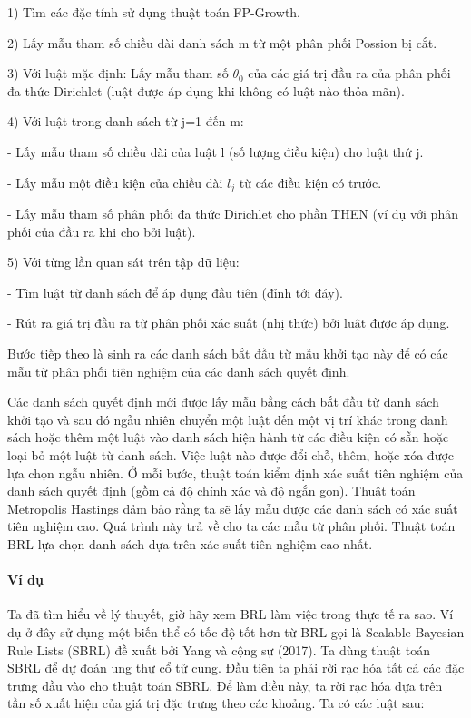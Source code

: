 1) Tìm các đặc tính sử dụng thuật toán FP-Growth.

2) Lấy mẫu tham số chiều dài danh sách m từ một phân phối Possion bị cắt.

3) Với luật mặc định: Lấy mẫu tham số $\theta_0$ của các giá trị đầu ra của phân phối đa thức Dirichlet (luật được áp dụng khi không có luật nào thỏa mãn).

4) Với luật trong danh sách từ j=1 đến m:

- Lấy mẫu tham số chiều dài của luật l (số lượng điều kiện) cho luật thứ j.

- Lấy mẫu một điều kiện của chiều dài $l_j$ từ các điều kiện có trước.

- Lấy mẫu tham số phân phối đa thức Dirichlet cho phần THEN (ví dụ với phân phối của đầu ra khi cho bởi luật).

5) Với từng lần quan sát trên tập dữ liệu:

- Tìm luật từ danh sách để áp dụng đầu tiên (đỉnh tới đáy).

- Rút ra giá trị đầu ra từ phân phối xác suất (nhị thức) bởi luật được áp dụng.

Bước tiếp theo là sinh ra các danh sách bắt đầu từ mẫu khởi tạo này để có các mẫu từ phân phối tiên nghiệm của các danh sách quyết định.

Các danh sách quyết định mới được lấy mẫu bằng cách bắt đầu từ danh sách khởi tạo và sau đó ngẫu nhiên chuyển một luật đến một vị trí khác trong danh sách hoặc thêm một luật vào danh sách hiện hành từ các điều kiện có sẵn hoặc loại bỏ một luật từ danh sách. Việc luật nào được đổi chỗ, thêm, hoặc xóa được lựa chọn ngẫu nhiên. Ở mỗi bước, thuật toán kiểm định xác suất tiên nghiệm của danh sách quyết định (gồm cả độ chính xác và độ ngắn gọn). Thuật toán Metropolis Hastings đảm bảo rằng ta sẽ lấy mẫu được các danh sách có xác suất tiên nghiệm cao. Quá trình này trả về cho ta các mẫu từ phân phối. Thuật toán BRL lựa chọn danh sách dựa trên xác suất tiên nghiệm cao nhất.

\paragraph{Ví dụ}

Ta đã tìm hiểu về lý thuyết, giờ hãy xem BRL làm việc trong thực tế ra sao. Ví dụ ở đây sử dụng một biến thể có tốc độ tốt hơn từ BRL gọi là Scalable Bayesian Rule Lists (SBRL) đề xuất bởi Yang và cộng sự (2017). Ta dùng thuật toán SBRL để dự đoán ung thư cổ tử cung. Đầu tiên ta phải rời rạc hóa tất cả các đặc trưng đầu vào cho thuật toán SBRL. Để làm điều này, ta rời rạc hóa dựa trên tần số xuất hiện của giá trị đặc trưng theo các khoảng. Ta có các luật sau:

